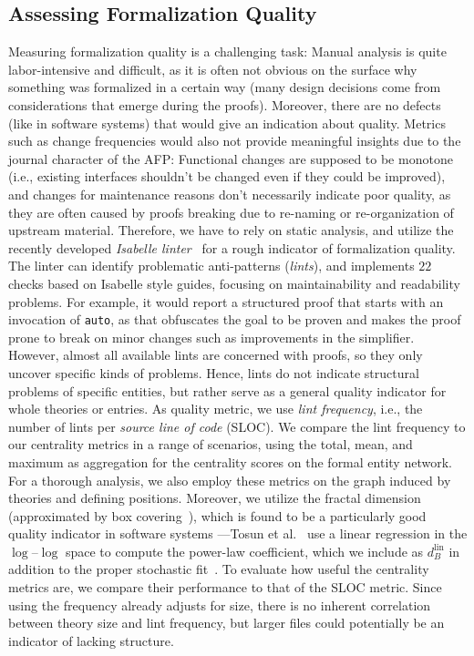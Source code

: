 \subsection{Assessing Formalization Quality}
Measuring formalization quality is a challenging task:
Manual analysis is quite labor-intensive and difficult,
as it is often not obvious on the surface why something was formalized in a certain way
(many design decisions come from considerations that emerge during the proofs).
Moreover, there are no defects (like in software systems) that would give an indication about quality.
Metrics such as change frequencies would also not provide meaningful insights due to the journal character of the AFP:
Functional changes are supposed to be monotone
(i.e., existing interfaces shouldn't be changed even if they could be improved),
and changes for maintenance reasons don't necessarily indicate poor quality,
as they are often caused by proofs breaking due to re-naming or re-organization of upstream material.
Therefore, we have to rely on static analysis,
and utilize the recently developed \emph{Isabelle linter}~\cite{Linter2022Megdiche}
for a rough indicator of formalization quality.
The linter can identify problematic anti-patterns (\emph{lints}),
and implements $22$ checks based on Isabelle style guides,
focusing on maintainability and readability problems.
For example, it would report a structured proof that starts with an invocation of \texttt{auto},
as that obfuscates the goal to be proven and makes the proof prone to break on minor changes
such as improvements in the simplifier.
However, almost all available lints are concerned with proofs, so they only uncover specific kinds of problems.
Hence, lints do not indicate structural problems of specific entities,
but rather serve as a general quality indicator for whole theories or entries.
As quality metric, we use \emph{lint frequency}, i.e., the number of lints per \emph{source line of code} (SLOC).
We compare the lint frequency to our centrality metrics in a range of scenarios,
using the total, mean, and maximum as aggregation for the centrality scores on the formal entity network.
For a thorough analysis, we also employ these metrics on the graph induced by theories and defining positions.
Moreover, we utilize the fractal dimension (approximated by box covering~\cite{FractalDimension2007Song}),
which is found to be a particularly good quality indicator in software systems%
---Tosun et al.~\cite{NetworkDefects2009Tosun} use a linear regression in the $\log$--$\log$ space to compute the power-law coefficient,
which we include as $d_B^\text{lin}$ in addition to the proper stochastic fit~\cite{PowlawEmpiric2009Clauset}.
To evaluate how useful the centrality metrics are,
we compare their performance to that of the SLOC metric.
Since using the frequency already adjusts for size,
there is no inherent correlation between theory size and lint frequency,
but larger files could potentially be an indicator of lacking structure.

